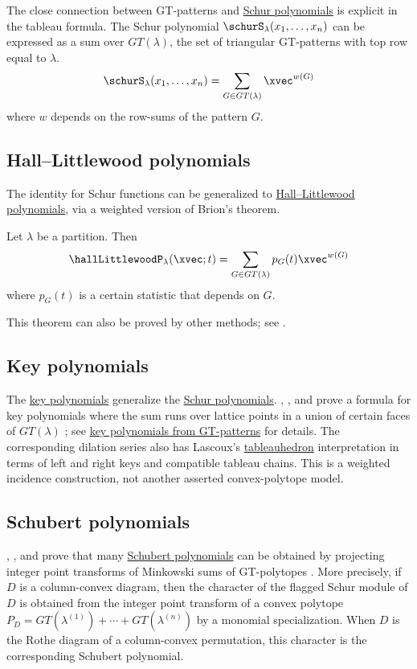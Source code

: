 The close connection between GT-patterns and \hyperref[schurS]{Schur polynomials}
is explicit in the tableau formula.  The Schur polynomial
$\schurS_\lambda(x_1,\dotsc,x_n)$ can be expressed as a sum over
$GT(\lambda)$, the set of triangular GT-patterns with top row equal to
$\lambda$.
\[
\schurS_\lambda(x_1,\dotsc,x_n) = \sum_{G \in GT(\lambda) } \xvec^{w(G)}
\]
where $w$ depends on the row-sums of the pattern $G$.

\subsection[gtHL]{Hall--Littlewood polynomials}

The identity for Schur functions can be
generalized to \hyperref[hallLittlewoodP]{Hall--Littlewood polynomials},
via a weighted version of Brion's theorem.
\begin{theorem}
Let $\lambda$ be a partition. Then
\begin{equation*}
 \hallLittlewoodP_\lambda(\xvec;t) = \sum_{G \in GT(\lambda) } p_G(t) \xvec^{w(G)}
\end{equation*}
where $p_G(t)$ is a certain statistic that depends on $G$.
\end{theorem}
This theorem can also be proved by other methods; see \cite{Macdonald1995}.



\subsection[gtKey]{Key polynomials}

The \hyperref[key]{key polynomials} generalize the
\hyperref[schurS]{Schur polynomials}.
, , and
 prove a formula for key polynomials where the sum runs
over lattice points in a union of certain faces of $GT(\lambda)$
\cite{KiritchenkoSmirnovTimorin2010}; see
\hyperref[keyDefinitionGT]{key polynomials from GT-patterns} for details.
The corresponding dilation series also has Lascoux's
\hyperref[lascouxTableauhedron]{tableauhedron} interpretation in terms of
left and right keys and compatible tableau chains.  This is a weighted
incidence construction, not another asserted convex-polytope model.


\subsection[gtSchubert]{Schubert polynomials}

, , and 
prove that many \hyperref[schubertGTFormula]{Schubert polynomials} can be
obtained by projecting integer point transforms of Minkowski sums of
GT-polytopes \cite{LiuMeszarosDizier2019}.  More precisely, if $D$ is a
column-convex diagram, then the character of the flagged Schur module of $D$
is obtained from the integer point transform of a convex polytope
$P_D=GT(\lambda^{(1)})+\dotsb+GT(\lambda^{(n)})$ by a monomial
specialization.  When $D$ is the Rothe diagram of a column-convex permutation,
this character is the corresponding Schubert polynomial.
